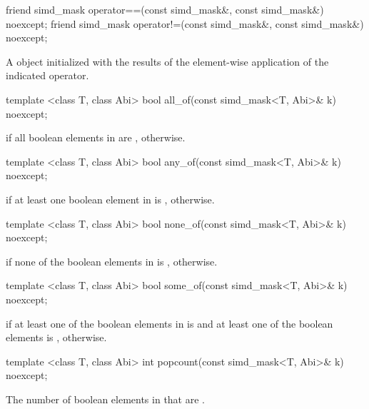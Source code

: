 \begin{itemdecl}
friend simd_mask operator==(const simd_mask&, const simd_mask&) noexcept;
friend simd_mask operator!=(const simd_mask&, const simd_mask&) noexcept;
\end{itemdecl}
\begin{itemdescr}
  \pnum\returns A \mask object initialized with the results of the element-wise application of the indicated operator.
\end{itemdescr}

\begin{itemdecl}
template <class T, class Abi> bool  all_of(const simd_mask<T, Abi>& k) noexcept;
\end{itemdecl}
\begin{itemdescr}
  \pnum\returns \true if all boolean elements in  are \true, \false otherwise.
\end{itemdescr}

\begin{itemdecl}
template <class T, class Abi> bool  any_of(const simd_mask<T, Abi>& k) noexcept;
\end{itemdecl}
\begin{itemdescr}
  \pnum\returns \true if at least one boolean element in  is \true, \false otherwise.
\end{itemdescr}

\begin{itemdecl}
template <class T, class Abi> bool none_of(const simd_mask<T, Abi>& k) noexcept;
\end{itemdecl}
\begin{itemdescr}
  \pnum\returns \true if none of the boolean elements in  is \true, \false otherwise.
\end{itemdescr}

\begin{itemdecl}
template <class T, class Abi> bool some_of(const simd_mask<T, Abi>& k) noexcept;
\end{itemdecl}
\begin{itemdescr}
  \pnum\returns \true if at least one of the boolean elements in  is \true and at least one of the boolean elements  is \false, \false otherwise.
\end{itemdescr}

\begin{itemdecl}
template <class T, class Abi> int popcount(const simd_mask<T, Abi>& k) noexcept;
\end{itemdecl}
\begin{itemdescr}
  \pnum\returns The number of boolean elements in  that are \true.
\end{itemdescr}

